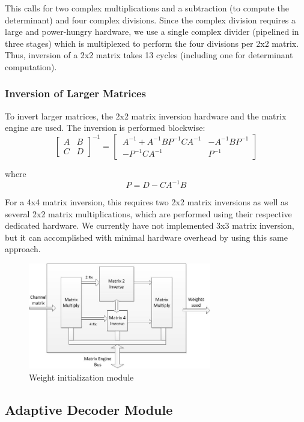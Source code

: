 \documentclass[journal]{IEEEtran}
\begin{document}
This calls for two complex multiplications and a subtraction (to compute the determinant) and four complex divisions. Since the complex division requires a large and power-hungry hardware, we use a single complex divider (pipelined in three stages) which is multiplexed to perform the four divisions per 2x2 matrix. Thus, inversion of a 2x2 matrix takes 13 cycles (including one for determinant computation).

\subsubsection{Inversion of Larger Matrices}

To invert larger matrices, the 2x2 matrix inversion hardware and the matrix engine are used. The inversion is performed blockwise:
\[\left[ \begin{array}{cc} A & B \\ C & D \end{array}\right]^{-1} = \left[ \ \begin{array}{cc} A^{-1}+A^{-1}BP^{-1}CA^{-1} & -A^{-1}BP^{-1} \\ -P^{-1}CA^{-1} & P^{-1} \end{array} \right] \]

where \[ P = D-CA^{-1}B \]


For a 4x4 matrix inversion, this requires two 2x2 matrix inversions as well as several 2x2 matrix multiplications, which are performed using their respective dedicated hardware. We currently have not implemented 3x3 matrix inversion, but it can accomplished with minimal hardware overhead by using this same approach. 

\begin{figure}
\centering
\includegraphics*[width=8cm]{images/initialize_weights.jpg}
\caption{Weight initialization module}
\label{initialize_weights}
\end{figure}

\subsection{Adaptive Decoder Module}
\end{document}
